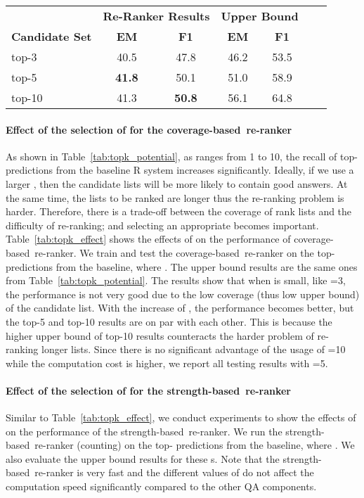 \documentclass{article} \usepackage{iclr2018_conference,times}
\def \coherence {strength-based}
\def \union {coverage-based}
\begin{document}
\begin{table*}[t]
\centering
\begin{tabular}{lcccccc}
\toprule
                  & \multicolumn{2}{c}{\bf Re-Ranker Results} & \multicolumn{2}{c}{\bf Upper Bound} \\
    \bf Candidate Set             & \bf EM            & \bf F1            & \bf EM            & \bf F1 \\
\midrule
top-3 & 40.5 & 47.8 & 46.2 & 53.5  \\
top-5   & \textbf{41.8} & 50.1  & 51.0 & 58.9  \\
top-10  & 41.3 & \textbf{50.8} & 56.1 & 64.8   \\
\bottomrule
\end{tabular}
\normalsize
\caption{Results of running \union\ re-ranker on different number of the top- answer candidates on Quasar-T (dev set).}
\label{tab:topk_effect}
\end{table*}
\paragraph{Effect of the selection of  for the \union\ re-ranker}
As shown in Table~\ref{tab:topk_potential}, as  ranges from 1 to 10, the recall of top- predictions from the baseline R system increases significantly. Ideally, if we use a larger , then the candidate lists will be more likely to contain good answers. At the same time, the lists to be ranked are longer thus the re-ranking problem is harder. Therefore, there is a trade-off between the coverage of rank lists and the difficulty of re-ranking; and selecting an appropriate  becomes important.
Table~\ref{tab:topk_effect} shows the effects of  on the performance of \union\ re-ranker.
We train and test the \union\ re-ranker on the top- predictions from the baseline, where .
The upper bound results are the same ones from Table~\ref{tab:topk_potential}. The results show that when  is small, like =3, the performance is not very good due to the low coverage (thus low upper bound) of the candidate list. With the increase of , the performance becomes better, but the top-5 and top-10 results are on par with each other. This is because the higher upper bound of top-10 results counteracts the harder problem of re-ranking longer lists. Since there is no significant advantage of the usage of =10 while the computation cost is higher, we report all testing results with =5.

\paragraph{Effect of the selection of  for the \coherence\ re-ranker}
Similar to Table~\ref{tab:topk_effect}, we conduct experiments to show the effects of  on the performance of the \coherence\ re-ranker. We run the \coherence\ re-ranker (counting) on the top- predictions from the baseline, where . We also evaluate the upper bound results for these s. Note that the \coherence\ re-ranker is very fast and the different values of  do not affect the computation speed significantly compared to the other QA components. 
\end{document}

